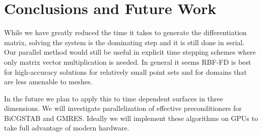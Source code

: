 \documentclass[12pt]{article}
\begin{document}
\section{Conclusions and Future Work}

	While we have greatly reduced the time it takes to generate the differentiation matrix, solving the system is the dominating step and it is still done in serial. Our parallel method would still be useful in explicit time stepping schemes where only matrix vector multiplication is needed. In general it seems RBF-FD is best for high-accuracy solutions for relatively small point sets and for domains that are less amenable to meshes. 
	
	In the future we plan to apply this to time dependent surfaces in three dimensions. We will investigate parallelization of effective preconditioners for BiCGSTAB and GMRES. Ideally we will implement these algorithms on GPUs to take full advantage of modern hardware.

 
 
\printbibliography
\end{document}

